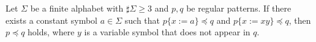 \begin{lem}\label{補題15}
Let $\Sigma$ be a finite alphabet with $\sharp \Sigma \ge 3$ and $p,q$ be regular patterns.
If there exists a constant symbol $a \in \Sigma$ such that $p \{ x := a \} \preceq q$ and $p \{ x := xy \} \preceq q$, then $p \preceq q$ holds, where $y$ is a variable symbol that does not appear in $q$.
\end{lem}

